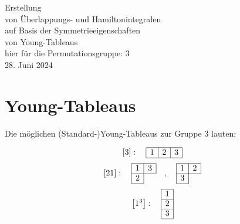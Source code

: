 \documentclass[fleqn]{article}%
\begin{document}
%
\normalsize%
\noindent%
\thispagestyle{empty}%
\begin{center}%
\vspace*{4cm}%
\Huge{}%
Erstellung %
\\ %
 von Überlappungs{-} und Hamiltonintegralen %
\\ %
 auf Basis der Symmetrieeigenschaften %
\\ %
 von Young{-}Tableaus%
\\ %
\vspace{1cm}%
\Large{hier für die Permutationsgruppe: 3}%
\\ %
\vspace{4cm}%
\Large{28. Juni 2024}%
\end{center}%
\newpage%
\setcounter{page}{1}%
\pagestyle{fancy}%
\fancyhf{}%
%
\fancyhead[R]{\nouppercase{\leftmark}}%
\renewcommand{\footrulewidth}{0.4pt}%
\fancyfoot[C]{\thepage}%
\section{Young{-}Tableaus}%
\label{sec:Young{-}Tableaus}%
Die möglichen (Standard-)Young-Tableaus zur Gruppe 3 lauten:

%
\vspace{0.25cm}%
\begin{dmath*}\left[3\right]:\quad\begin{array}{|c|c|c|} \hline 1 & 2 & 3\\ \cline{1-3} \end{array} \end{dmath*}%
\vspace{0.25cm}%
\begin{dmath*}\left[21\right]:\quad\begin{array}{|c|c|} \hline 1 & 3\\ \cline{1-2} 2\\ \cline{1-1} \end{array} \quad , \quad \begin{array}{|c|c|} \hline 1 & 2\\ \cline{1-2} 3\\ \cline{1-1} \end{array} \end{dmath*}%
\vspace{0.25cm}%
\begin{dmath*}\left[1^3\right]:\quad\begin{array}{|c|} \hline 1\\ \cline{1-1} 2\\ \cline{1-1} 3\\ \cline{1-1} \end{array} \end{dmath*}%
\vspace{0.25cm}%
\newpage%
\end{document}
